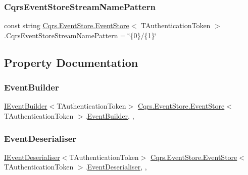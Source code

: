 \subsubsection{\texorpdfstring{Cqrs\+Event\+Store\+Stream\+Name\+Pattern}{CqrsEventStoreStreamNamePattern}}
{\footnotesize\ttfamily const string \hyperlink{classCqrs_1_1EventStore_1_1EventStore}{Cqrs.\+Event\+Store.\+Event\+Store}$<$ T\+Authentication\+Token $>$.Cqrs\+Event\+Store\+Stream\+Name\+Pattern = \char`\"{}\{0\}/\{1\}\char`\"{}\hspace{0.3cm}{\ttfamily [protected]}}



\subsection{Property Documentation}
\mbox{\label{classCqrs_1_1EventStore_1_1EventStore_ae1bc9d364582e951ccdc0f91908b94a2_ae1bc9d364582e951ccdc0f91908b94a2}} 
\subsubsection{\texorpdfstring{Event\+Builder}{EventBuilder}}
{\footnotesize\ttfamily \hyperlink{interfaceCqrs_1_1EventStore_1_1IEventBuilder}{I\+Event\+Builder}$<$T\+Authentication\+Token$>$ \hyperlink{classCqrs_1_1EventStore_1_1EventStore}{Cqrs.\+Event\+Store.\+Event\+Store}$<$ T\+Authentication\+Token $>$.\hyperlink{classCqrs_1_1Events_1_1EventBuilder}{Event\+Builder}\hspace{0.3cm}{\ttfamily [get]}, {\ttfamily [set]}, {\ttfamily [protected]}}

\mbox{\label{classCqrs_1_1EventStore_1_1EventStore_a2b9140681d6bd25afb3a842e4cbf37cf_a2b9140681d6bd25afb3a842e4cbf37cf}} 
\subsubsection{\texorpdfstring{Event\+Deserialiser}{EventDeserialiser}}
{\footnotesize\ttfamily \hyperlink{interfaceCqrs_1_1EventStore_1_1IEventDeserialiser}{I\+Event\+Deserialiser}$<$T\+Authentication\+Token$>$ \hyperlink{classCqrs_1_1EventStore_1_1EventStore}{Cqrs.\+Event\+Store.\+Event\+Store}$<$ T\+Authentication\+Token $>$.\hyperlink{classCqrs_1_1Events_1_1EventDeserialiser}{Event\+Deserialiser}\hspace{0.3cm}{\ttfamily [get]}, {\ttfamily [set]}, {\ttfamily [protected]}}

